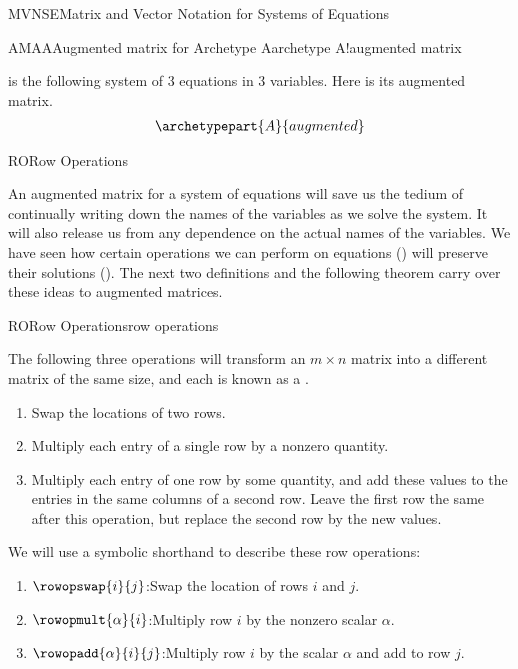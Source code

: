 \begin{subsect}{MVNSE}{Matrix and Vector Notation for Systems of Equations}
\begin{example}{AMAA}{Augmented matrix for Archetype A}{archetype A!augmented matrix}
\begin{para} is the following system of 3 equations in 3 variables.
Here is its augmented matrix.
\begin{align*}
\archetypepart{A}{augmented}\end{align*}
\end{para}
\end{example}
%
%
\end{subsect}
%
\begin{subsect}{RO}{Row Operations}
%
\begin{para}An augmented matrix for a system of equations will save us the tedium of continually writing down the names of the variables as we solve the system.  It will also release us from any dependence on the actual names of the variables.  We have seen how certain operations we can perform on equations () will preserve their solutions ().  The next two definitions and the following theorem carry over these ideas to augmented matrices.\end{para}
%
\begin{definition}{RO}{Row Operations}{row operations}
\begin{para}The following three operations will transform an $m\times n$ matrix into a different matrix of the same size, and each is known as a .
%
\begin{enumerate}
\item Swap the locations of two rows.
\item Multiply each entry of a single row by a nonzero quantity.
\item Multiply each entry of one row by some quantity, and add these values to the entries in the same columns of a second row.  Leave the first row the same after this operation, but replace the second row by the new values.
\end{enumerate}
We will use a symbolic shorthand to describe these row operations:
\begin{enumerate}
\item $\rowopswap{i}{j}$:\quad Swap the location of rows $i$ and $j$.
\item $\rowopmult{\alpha}{i}$:\quad Multiply row $i$ by the nonzero scalar $\alpha$.
\item $\rowopadd{\alpha}{i}{j}$:\quad Multiply row $i$ by the scalar $\alpha$ and add to row $j$.
\end{enumerate}\end{para}

\end{definition}
\end{subsect}
